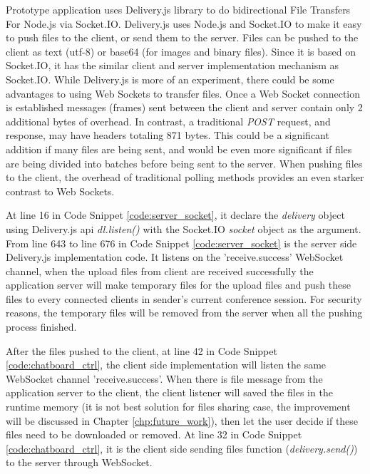 \par Prototype application uses Delivery.js library to do bidirectional File Transfers For Node.js via Socket.IO. Delivery.js uses Node.js and Socket.IO to make it easy to push files to the client, or send them to the server. Files can be pushed to the client as text (utf-8) or base64 (for images and binary files).\cite{github:deliveryjs} Since it is based on Socket.IO, it has the similar client and server implementation mechanism as Socket.IO. While Delivery.js is more of an experiment, there could be some advantages to using Web Sockets to transfer files. Once a Web Socket connection is established messages (frames) sent between the client and server contain only 2 additional bytes of overhead. In contrast, a traditional \textit{POST} request, and response, may have headers totaling 871 bytes. This could be a significant addition if many files are being sent, and would be even more significant if files are being divided into batches before being sent to the server. When pushing files to the client, the overhead of traditional polling methods provides an even starker contrast to Web Sockets.

\par At line 16 in Code Snippet \ref{code:server_socket}, it declare the \textit{delivery} object using Delivery.js \gls{api} \textit{dl.listen()} with the Socket.IO \textit{socket} object as the argument. From line 643 to line 676 in Code Snippet \ref{code:server_socket} is the server side Delivery.js implementation code. It listens on the 'receive.success' WebSocket channel, when the upload files from client are received successfully the application server will make temporary files for the upload files and push these files to every connected clients in sender's current conference session. For security reasons, the temporary files will be removed from the server when all the pushing process finished.

\par After the files pushed to the client, at line 42 in Code Snippet \ref{code:chatboard_ctrl}, the client side implementation will listen the same WebSocket channel 'receive.success'. When there is file message from the application server to the client, the client listener will saved the files in the runtime memory (it is not best solution for files sharing case, the improvement will be discussed in Chapter \ref{chp:future_work}), then let the user decide if these files need to be downloaded or removed. At line 32 in Code Snippet \ref{code:chatboard_ctrl}, it is the client side sending files function (\textit{delivery.send()}) to the server through WebSocket.

